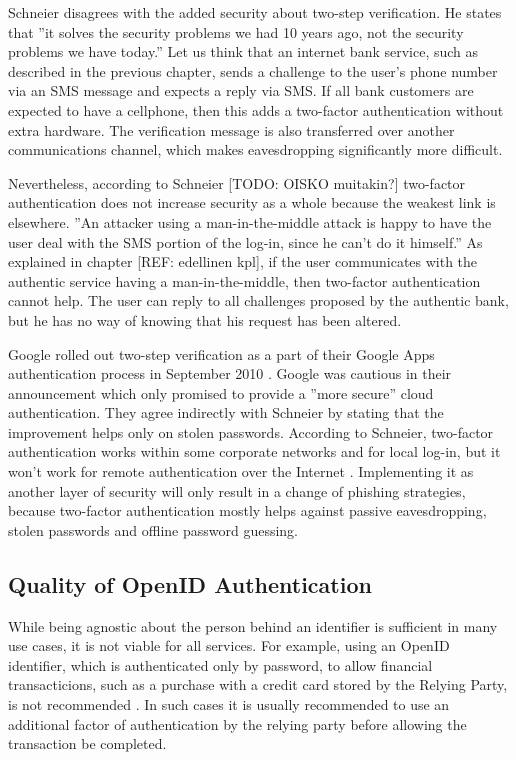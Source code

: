 \documentclass{tktltiki}
\begin{document}
    Schneier \cite{schneier_2factor_2005} disagrees with the added security about two-step verification. He states that ''it solves the security problems we had 10 years ago, not the security problems we have today.'' Let us think that an internet bank service, such as described in the previous chapter, sends a challenge to the user's phone number via an SMS message and expects a reply via SMS. If all bank customers are expected to have a cellphone, then this adds a two-factor authentication without extra hardware. The verification message is also transferred over another communications channel, which makes eavesdropping significantly more difficult.

    Nevertheless, according to Schneier \cite{schneier_2factor_2005} [TODO: OISKO muitakin?] two-factor authentication does not increase security as a whole because the weakest link is elsewhere. ''An attacker using a man-in-the-middle attack is happy to have the user deal with the SMS portion of the log-in, since he can’t do it himself.'' \cite{schneier_2factor_2005} As explained in chapter [REF: edellinen kpl], if the user communicates with the authentic service having a man-in-the-middle, then two-factor authentication cannot help. The user can reply to all challenges proposed by the authentic bank, but he has no way of knowing that his request has been altered.

    Google rolled out two-step verification as a part of their Google Apps authentication process in September 2010 \cite{google_2step_2010}. Google was cautious in their announcement which only promised to provide a ''more secure'' cloud authentication. They agree indirectly with Schneier \cite{schneier_2factor_2005} by stating that the improvement helps only on stolen passwords. According to Schneier, two-factor authentication works within some corporate networks and for local log-in, but it won't work for remote authentication over the Internet \cite{schneier_2factor_2005}. Implementing it as another layer of security will only result in a change of phishing strategies, because two-factor authentication mostly helps against passive eavesdropping, stolen passwords and offline password guessing.



\subsection{Quality of OpenID Authentication}


   While being agnostic about the person behind an identifier is sufficient in many use cases, it is not viable for all services. For example, using an OpenID identifier, which is authenticated only by password, to allow financial transacticions, such as a purchase with a credit card stored by the Relying Party, is not recommended \cite{yahoo_openid_bestpractices_2010}. In such cases it is usually recommended to use an additional factor of authentication by the relying party before allowing the transaction be completed. 
       
\end{document}
